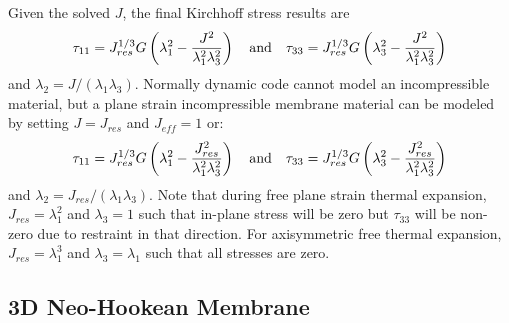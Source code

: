 \documentclass[11pt]{book}
\def\Jeff{J_{eff}}
\def\Jres{J_{res}}
\begin{document}
Given the solved $J$, the final Kirchhoff stress results are
\begin{equation}
      \tau_{11} =  \Jres^{1/3}G \left(\lambda_1^2-{J^2\over\lambda_1^2\lambda_3^2}\right) \quad{\rm and}\quad
     \tau_{33} = \Jres^{1/3}G \left(\lambda_3^2-{J^2\over\lambda_1^2\lambda_3^2}\right)
\end{equation}
and $\lambda_2 = J/(\lambda_1
\lambda_3)$. Normally dynamic code cannot model an incompressible material, but a plane strain incompressible membrane material can be modeled by setting $J=\Jres$ and $\Jeff=1$ or:
\begin{equation}
      \tau_{11} =  \Jres^{1/3}G \left(\lambda_1^2-{\Jres^2\over\lambda_1^2\lambda_3^2}\right) \quad{\rm and}\quad
     \tau_{33} = \Jres^{1/3}G \left(\lambda_3^2-{\Jres^2\over\lambda_1^2\lambda_3^2}\right)
\end{equation}
and $\lambda_2 = \Jres/(\lambda_1\lambda_3)$. Note that during free plane strain thermal expansion, $\Jres=\lambda_1^2$ and $\lambda_3=1$ such that in-plane stress will be zero but $\tau_{33}$ will be non-zero due to restraint in that direction. For axisymmetric free thermal expansion, $\Jres=\lambda_1^3$ and $\lambda_3=\lambda_1$ such that all stresses are zero.

\subsection{3D Neo-Hookean Membrane}
\end{document}
